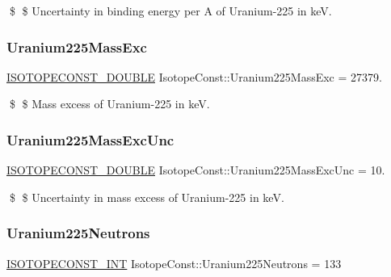 \$ \$ Uncertainty in binding energy per A of Uranium-\/225 in keV. \mbox{\label{group___isotope_const-_uranium-_u225_gac36067bdbcdeb9fad39971aba5ba1c2c}} 
\subsubsection{\texorpdfstring{Uranium225\+Mass\+Exc}{Uranium225MassExc}}
{\footnotesize\ttfamily \mbox{\hyperlink{group___isotope_const-_macros_ga8f45a7272ce02c0b4c65c44636ed719a}{I\+S\+O\+T\+O\+P\+E\+C\+O\+N\+S\+T\+\_\+\+D\+O\+U\+B\+LE}} Isotope\+Const\+::\+Uranium225\+Mass\+Exc = 27379.}

\$ \$ Mass excess of Uranium-\/225 in keV. \mbox{\label{group___isotope_const-_uranium-_u225_ga66bc90d6aa8714726e8665848b173e2f}} 
\subsubsection{\texorpdfstring{Uranium225\+Mass\+Exc\+Unc}{Uranium225MassExcUnc}}
{\footnotesize\ttfamily \mbox{\hyperlink{group___isotope_const-_macros_ga8f45a7272ce02c0b4c65c44636ed719a}{I\+S\+O\+T\+O\+P\+E\+C\+O\+N\+S\+T\+\_\+\+D\+O\+U\+B\+LE}} Isotope\+Const\+::\+Uranium225\+Mass\+Exc\+Unc = 10.}

\$ \$ Uncertainty in mass excess of Uranium-\/225 in keV. \mbox{\label{group___isotope_const-_uranium-_u225_gae18d9764164a0c97a1a2533ac4409380}} 
\subsubsection{\texorpdfstring{Uranium225\+Neutrons}{Uranium225Neutrons}}
{\footnotesize\ttfamily \mbox{\hyperlink{group___isotope_const-_macros_ga5f18360b3e99483a35c32d789e62621c}{I\+S\+O\+T\+O\+P\+E\+C\+O\+N\+S\+T\+\_\+\+I\+NT}} Isotope\+Const\+::\+Uranium225\+Neutrons = 133}

